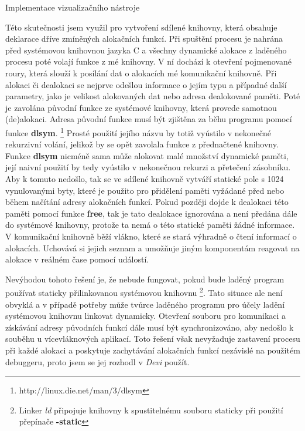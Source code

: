 \documentclass[czech,bachelor,male,python,dept460,hidelinks]{diploma}						%
\newcommand{\parspace}[1][]{
	\ifthenelse{\isempty{#1}}{\vspace{5mm}}{\vspace{#1}}
	\par
}
\begin{document}
\begin{section}{Implementace vizualizačního nástroje}
				\parspace Této skutečnosti jsem využil pro vytvoření sdílené knihovny, která obsahuje deklarace dříve zmíněných alokačních funkcí.
				Při spuštění procesu je nahrána před systémovou knihovnou jazyka C a všechny dynamické alokace z laděného procesu poté volají funkce z mé knihovny.
				V ní dochází k otevření pojmenované roury, která slouží k posílání dat o alokacích mé komunikační knihovně.
				Při alokaci či dealokaci se nejprve odešlou informace o jejím typu a případné další parametry, jako je velikost alokovaných dat
				nebo adresa dealokované paměti. Poté je zavolána původní funkce ze systémové knihovny, která provede samotnou (de)alokaci.
				Adresa původní funkce musí být zjištěna za běhu programu pomocí
				funkce \textbf{dlsym}. \footnote{http://linux.die.net/man/3/dlsym} Prosté použití jejího názvu by totiž vyústilo v nekonečné rekurzivní volání, jelikož
				by se opět zavolala funkce z přednačtené knihovny. Funkce \textbf{dlsym} nicméně sama může alokovat malé množství dynamické paměti,
				její naivní použití by tedy vyústilo v nekonečnou rekurzi a přetečení zásobníku.
				Aby k tomuto nedošlo, tak se ve sdílené knihovně vytváří statické pole s 1024 vynulovanými
				byty, které je použito pro přidělení paměti vyžádané před nebo během načítání adresy alokačních funkcí. Pokud později dojde k dealokaci této
				paměti pomocí funkce \textbf{free}, tak je tato dealokace ignorována a není předána dále do systémové knihovny, protože ta nemá o této statické paměti
				žádné informace. V komunikační knihovně běží vlákno, které se stará výhradně o čtení informací o alokacích. Uchovává si jejich seznam
				a umožňuje jiným komponentám reagovat na alokace v reálném čase pomocí událostí.
				
				\parspace Nevýhodou tohoto řešení je, že nebude fungovat, pokud bude laděný program používat staticky přilinkovanou systémovou knihovnu
				\footnote{Linker \textit{ld} připojuje knihovny k spustitelnému souboru staticky při použití přepínače \textbf{-static}}.
				Tato situace ale není obvyklá a v případě potřeby může tvůrce laděného programu pro účely ladění systémovou knihovnu linkovat dynamicky.
				Otevření souboru pro komunikaci a získávání adresy původních funkcí dále musí být synchronizováno, aby nedošlo k souběhu u vícevláknových aplikací.
				Toto řešení však nevyžaduje zastavení procesu při každé alokaci a poskytuje zachytávání alokačních funkcí nezávislé na použitém debuggeru, proto
				jsem se jej rozhodl v \textit{Devi} použít.
				
			

\end{section}
\end{document}
